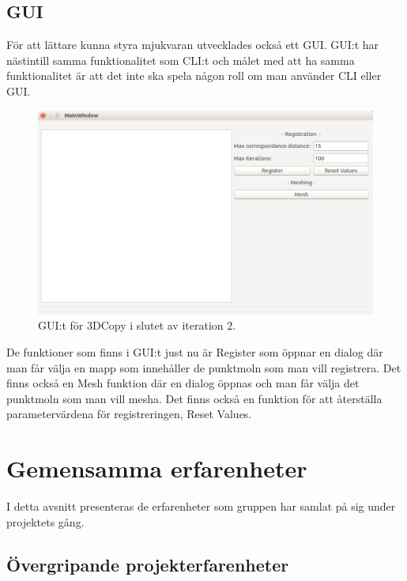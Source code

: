 \subsection{GUI}
För att lättare kunna styra mjukvaran utvecklades också ett GUI. GUI:t har nästintill samma funktionalitet som CLI:t och målet med att ha samma funktionalitet är att det inte ska spela någon roll om man använder CLI eller GUI.

\begin{figure}[H]
	\centering
	\includegraphics[width=130mm]{figures/3DCopyGUI.PNG}
	\caption{GUI:t för 3DCopy i slutet av iteration 2.}
	\label{fig:3dcopy_gui}
\end{figure}

De funktioner som finns i GUI:t just nu är Register som öppnar en dialog där man får välja en mapp som innehåller de punktmoln som man vill registrera. Det finns också en Mesh funktion där en dialog öppnas och man får välja det punktmoln som man vill mesha. Det finns också en funktion för att återställa parametervärdena för registreringen, Reset Values.

\section{Gemensamma erfarenheter}

I detta avsnitt presenteras de erfarenheter som gruppen har samlat på sig under projektets gång.

\subsection{Övergripande projekterfarenheter}

